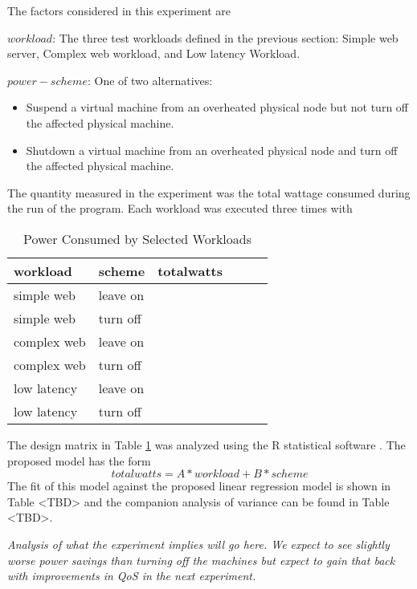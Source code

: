 \documentclass[times, 10pt,twocolumn]{article}
\begin{document}
The factors considered in this experiment are
\begin{list}{}{}
\item $workload$: The three test workloads defined in the previous
  section: Simple web server, Complex web workload, and Low latency Workload.
\item $power-scheme$: One of two alternatives:
  \begin{itemize}
  \item Suspend a virtual machine from an overheated physical node but not
    turn off the affected physical machine.
  \item Shutdown a virtual machine from an overheated physical node and turn
    off the affected physical machine.
  \end{itemize}
\end{list}
The quantity measured in the experiment was the total wattage consumed during
the run of the program.  Each workload was executed three times with 
\begin{table}
  \centering
  \begin{tabular}{l|l|l|lll}
    workload&scheme&totalwatts&&\\
    \hline
    simple web&leave on& & & \\
    simple web&turn off& & & \\
    complex web&leave on& & & \\
    complex web&turn off& & & \\
    low latency&leave on& & & \\
    low latency&turn off& & & \\
  \end{tabular}
  \caption{Power Consumed by Selected Workloads}
  \label{tab:exp1}
\end{table}

The design matrix in Table \ref{tab:exp1} was analyzed using the R statistical
software \cite{R2007}.   The proposed model has the form
\begin{equation*}
  \label{exp1model}
  totalwatts = A*workload + B*scheme
\end{equation*}
The fit of this model against the proposed linear regression model is shown in
Table <TBD> and the companion analysis of variance can be found in Table
<TBD>.

\emph{Analysis of what the experiment implies will go here.  We expect to see
  slightly worse power savings than turning off the machines but expect to
  gain that back with improvements in QoS in the next experiment.}
\end{document}
